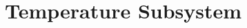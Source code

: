 \documentclass[../main]{subfiles}
\begin{document}
\chapter{Temperature Subsystem} \label{chp:tempSubsys}

%




\end{document}
